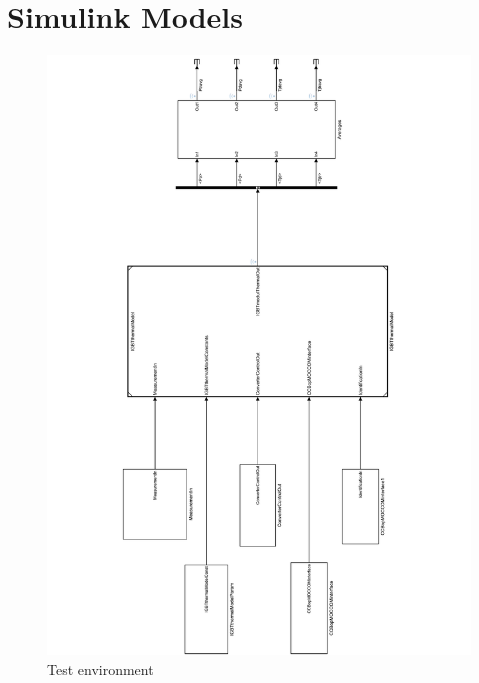 
%


\appendices
\section{Simulink Models}
\begin{figure}[!H]
\centering
\includegraphics[height=0.8\textwidth, angle = 270]{figures/IGBthermal_test_env.pdf}

\caption{Test environment}
\label{test_env}
\end{figure}

